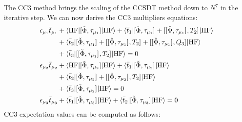 The \acrshort{CC3} method brings the scaling of the \acrshort{CCSDT}
method down to $N^7$ in the iterative step.
We can now derive the \acrshort{CC3} multipliers equations:
\begin{subequations}\label{eq:cc3-multipliers}
  \begin{align}
    \epsilon_{\mu_1}\bar{t}_{\mu_1} &+
     \braket{\mathrm{HF} | [ \check{\Phi}, \tau_{\mu_1} ]^{} | \mathrm{HF}}
   + \braket{\bar{t}_{1} |
       [ \check{\Phi}, \tau_{\mu_1} ]^{}
     + [ [ \check{\Phi}, \tau_{\mu_1} ]^{}, T_2 ]^{}
     | \mathrm{HF}} \nonumber \\
   &+ \braket{\bar{t}_{2} |
       [ \check{\Phi}, \tau_{\mu_1} ]^{}
     + [ [ \check{\Phi}, \tau_{\mu_1} ]^{}, T_2 ]^{}
     + [ [ \check{\Phi}, \tau_{\mu_1} ]^{}, Q_3 ]^{}
   | \mathrm{HF}} \nonumber \\
   &+ \braket{\bar{t}_{3} |
      [ [ \check{\Phi}, \tau_{\mu_1} ]^{}, T_2 ]^{}
     | \mathrm{HF}} = 0 \label{eq:cc3-singles-multipliers} \\
    \epsilon_{\mu_2}\bar{t}_{\mu_2} &+
    \braket{\mathrm{HF} | [ \check{\Phi}, \tau_{\mu_2} ]^{} | \mathrm{HF}}
   + \braket{\bar{t}_{1} |
       [ \check{\Phi}, \tau_{\mu_2} ]^{}
     | \mathrm{HF}} \nonumber \\
  &+ \braket{\bar{t}_{2} |
       [ \check{\Phi}, \tau_{\mu_2} ]^{}
     + [ [ \check{\Phi}, \tau_{\mu_2} ]^{}, T_2 ]^{}
     | \mathrm{HF}} \nonumber \\
  &+ \braket{\bar{t}_{3} |
       [ \check{\Phi}, \tau_{\mu_2} ]^{}
     | \mathrm{HF}}
    = 0 \label{eq:cc3-doubles-multipliers} \\
    \epsilon_{\mu_3}\bar{t}_{\mu_3} &+
    \braket{\bar{t}_{1} |
       [ \check{\Phi}, \tau_{\mu_3} ]^{}
     | \mathrm{HF}}
  + \braket{\bar{t}_{2} |
       [ \check{\Phi}, \tau_{\mu_3} ]^{}
     | \mathrm{HF}}
    = 0 \label{eq:cc3-triples-multipliers}
  \end{align}
\end{subequations}
\acrshort{CC3} expectation values can be computed as follows:
